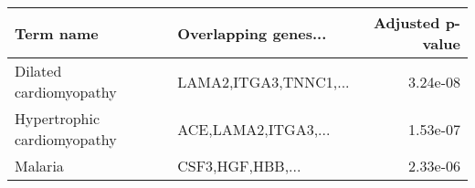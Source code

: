 \begin{tabular}{llr}
\toprule
                  Term name &  Overlapping genes... &  Adjusted p-value \\
\midrule
     Dilated cardiomyopathy & LAMA2,ITGA3,TNNC1,... &          3.24e-08 \\
Hypertrophic cardiomyopathy &   ACE,LAMA2,ITGA3,... &          1.53e-07 \\
                    Malaria &      CSF3,HGF,HBB,... &          2.33e-06 \\
\bottomrule
\end{tabular}
